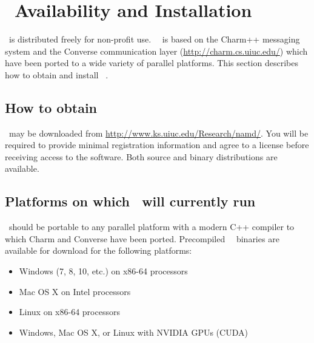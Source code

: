 
\section{\NAMD\ Availability and Installation}
\label{section:avail}

\NAMD\ is distributed freely for non-profit use.
\NAMD\ \NAMDVER\ is based on the Charm++ messaging system and the
Converse communication layer (\url{http://charm.cs.uiuc.edu/})
which have been ported to a wide variety of parallel platforms.
This section describes how to obtain and install \NAMD\ \NAMDVER.

\subsection{How to obtain \NAMD}

\NAMD\ may be downloaded from \url{http://www.ks.uiuc.edu/Research/namd/}.
You will be required to provide minimal registration information and
agree to a license before receiving access to the software.
Both source and binary distributions are available.

\subsection{Platforms on which \NAMD\ will currently run}
\NAMD\ should be portable to any parallel platform with a
modern C++ compiler to which Charm and Converse have been ported.
Precompiled \NAMD\ \NAMDVER\ binaries are available for
download for the following platforms:  

\begin{itemize}
\item Windows (7, 8, 10, etc.) on x86-64 processors
\item Mac OS X on Intel processors
\item Linux on x86-64 processors
\item Windows, Mac OS X, or Linux with NVIDIA GPUs (CUDA)
\end{itemize}

